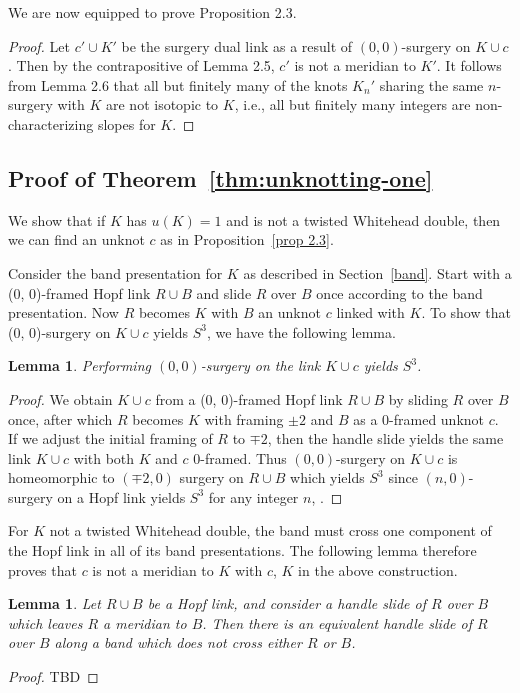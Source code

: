 \documentclass[11pt,usenames,dvipsnames,reqno]{amsart}
\numberwithin{theorem}{section}
\newtheorem{lemma}[theorem]{Lemma}
\theoremstyle{ex}
\theoremstyle{rem}
\begin{document}
We are now equipped to prove Proposition 2.3. 

\begin{proof}
Let $c' \cup K'$ be the surgery dual link as a result of $(0, 0)$-surgery on $K \cup c$. Then by the contrapositive of Lemma 2.5, $c'$ is not a meridian to $K'$. It follows from Lemma 2.6 that all but finitely many of the knots $K_n'$ sharing the same $n$-surgery with $K$ are not isotopic to $K$, i.e., all but finitely many integers are non-characterizing slopes for $K$.
\end{proof}


\subsection{Proof of Theorem~\ref{thm:unknotting-one}} We show that if $K$ has $u(K)=1$ and is not a twisted Whitehead double, then we can find an unknot $c$ as in Proposition~\ref{prop 2.3}. 

Consider the band presentation for $K$ as described in Section~\ref{band}. Start with a (0, 0)-framed Hopf link $R\cup B$ and slide $R$ over $B$ once according to the band presentation. Now $R$ becomes $K$ with $B$ an unknot $c$ linked with $K$. To show that (0, 0)-surgery on $K\cup c$ yields $S^3$, we have the following lemma. 

\begin{lemma}
	Performing $(0,0)$-surgery on the link $K\cup c$ yields $S^3$.
\end{lemma}

\begin{proof}
	We obtain $K\cup c$ from a (0, 0)-framed Hopf link $R \cup B$ by sliding $R$ over $B$ once, after which $R$ becomes $K$ with framing $\pm 2$ and $B$ as a 0-framed unknot $c$. If we adjust the initial framing of $R$ to $\mp 2$, then the handle slide yields the same link $K\cup c$ with both $K$ and $c$ 0-framed. Thus $(0,0)$-surgery on $K\cup c$ is homeomorphic to $(\mp 2,0)$ surgery on $R\cup B$ which yields $S^3$ since $(n,0)$-surgery on a Hopf link yields $S^3$ for any integer $n$, .
\end{proof}

For $K$ not a twisted Whitehead double, the band must cross one component of the Hopf link in all of its band presentations. The following lemma therefore proves that $c$ is not a meridian to $K$ with $c$, $K$ in the above construction.

\begin{lemma}
	Let $R\cup B$ be a Hopf link, and consider a handle slide of $R$ over $B$ which leaves $R$ a meridian to $B$. Then there is an equivalent handle slide of $R$ over $B$ along a band which does not cross either $R$ or $B$.
\end{lemma}
\begin{proof}
	TBD
\end{proof}
\end{document}
